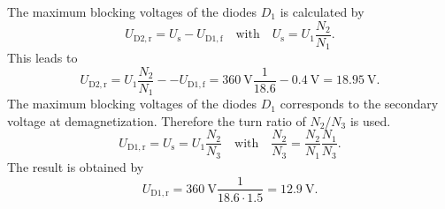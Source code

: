 \begin{solutionblock}
    The maximum blocking voltages of the diodes $D_\mathrm{1}$ is calculated by
    \begin{equation}
        U_\mathrm{D2,r}=U_\mathrm{s}-U_\mathrm{D1,f} \quad \text{with} \quad U_\mathrm{s}=U_\mathrm{1}\frac{N_\mathrm{2}}{N_\mathrm{1}}.
    \end{equation}
    This leads to
    \begin{equation}
        U_\mathrm{D2,r}=U_\mathrm{1}\frac{N_\mathrm{2}}{N_\mathrm{1}}--U_\mathrm{D1,f}=
        \SI{360}{\volt}\frac{1}{18.6}-\SI{0.4}{\volt}=\SI{18.95}{\volt}.
    \end{equation}
    The maximum blocking voltages of the diodes $D_\mathrm{1}$ corresponds to the secondary voltage at demagnetization.
    Therefore the turn ratio of $N_\mathrm{2}/N_\mathrm{3}$ is used.
    \begin{equation}
        U_\mathrm{D1,r}=U_\mathrm{s}=U_\mathrm{1}\frac{N_\mathrm{2}}{N_\mathrm{3}} \quad \text{with} \quad
        \frac{N_\mathrm{2}}{N_\mathrm{3}}=\frac{N_\mathrm{2}}{N_\mathrm{1}}\frac{N_\mathrm{1}}{N_\mathrm{3}}.
    \end{equation}
    The result is obtained by
    \begin{equation}
        U_\mathrm{D1,r}=\SI{360}{\volt}\frac{1}{18.6 \cdot 1.5}=\SI{12.9}{\volt}.
    \end{equation}
\end{solutionblock}

